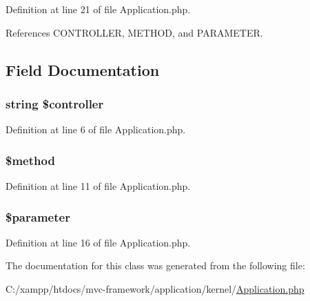 Definition at line 21 of file Application.\+php.



References C\+O\+N\+T\+R\+O\+L\+L\+E\+R, M\+E\+T\+H\+O\+D, and P\+A\+R\+A\+M\+E\+T\+E\+R.




\subsection{Field Documentation}
\hypertarget{class_application_a0eb1786d89f8acef683a1fbeeeb87518}{}
\subsubsection[{\$controller}]{\setlength{\rightskip}{0pt plus 5cm}string \$controller\hspace{0.3cm}{\ttfamily [protected]}}\label{class_application_a0eb1786d89f8acef683a1fbeeeb87518}


Definition at line 6 of file Application.\+php.

\hypertarget{class_application_a12661b2fc0f57f97e30a1620889ce9c6}{}
\subsubsection[{\$method}]{\setlength{\rightskip}{0pt plus 5cm}\$method\hspace{0.3cm}{\ttfamily [protected]}}\label{class_application_a12661b2fc0f57f97e30a1620889ce9c6}


Definition at line 11 of file Application.\+php.

\hypertarget{class_application_aaa59205ae9efcb66a11d385fe346253a}{}
\subsubsection[{\$parameter}]{\setlength{\rightskip}{0pt plus 5cm}\$parameter\hspace{0.3cm}{\ttfamily [protected]}}\label{class_application_aaa59205ae9efcb66a11d385fe346253a}


Definition at line 16 of file Application.\+php.



The documentation for this class was generated from the following file\+:\begin{DoxyCompactItemize}
\item 
C\+:/xampp/htdocs/mvc-\/framework/application/kernel/\hyperlink{_application_8php}{Application.\+php}\end{DoxyCompactItemize}
